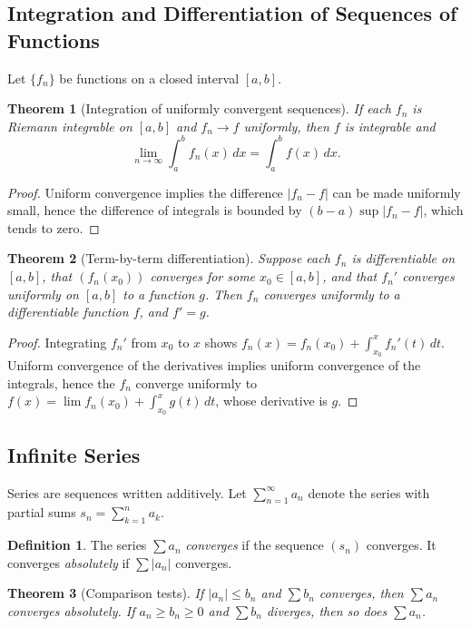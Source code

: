\documentclass{article}
\theoremstyle{definition}
\newtheorem{definition}{Definition}[section]
\theoremstyle{plain}
\newtheorem{theorem}{Theorem}[section]
\begin{document}
\subsection{Integration and Differentiation of Sequences of Functions}\label{subsec:integration-sequences}
Let $\{f_n\}$ be functions on a closed interval $[a,b]$.

\begin{theorem}[Integration of uniformly convergent sequences]\label{thm:uniform-integral}
	If each $f_n$ is Riemann integrable on $[a,b]$ and $f_n \to f$ uniformly, then $f$ is integrable and
	\[
		\lim_{n\to\infty} \int_a^b f_n(x)\,dx = \int_a^b f(x)\,dx.
	\]
\end{theorem}
\begin{proof}
	Uniform convergence implies the difference $|f_n-f|$ can be made uniformly small, hence the difference of integrals is bounded by $(b-a)\sup|f_n-f|$, which tends to zero.
\end{proof}

\begin{theorem}[Term-by-term differentiation]\label{thm:termwise-derivative}
	Suppose each $f_n$ is differentiable on $[a,b]$, that $(f_n(x_0))$ converges for some $x_0\in [a,b]$, and that $f_n'$ converges uniformly on $[a,b]$ to a function $g$. Then $f_n$ converges uniformly to a differentiable function $f$, and $f'=g$.
\end{theorem}
\begin{proof}
	Integrating $f_n'$ from $x_0$ to $x$ shows $f_n(x)=f_n(x_0)+\int_{x_0}^x f_n'(t)\,dt$. Uniform convergence of the derivatives implies uniform convergence of the integrals, hence the $f_n$ converge uniformly to $f(x)=\lim f_n(x_0)+\int_{x_0}^x g(t)\,dt$, whose derivative is $g$.
\end{proof}

\subsection{Infinite Series}\label{subsec:infinite-series}
Series are sequences written additively. Let $\sum_{n=1}^\infty a_n$ denote the series with partial sums $s_n = \sum_{k=1}^n a_k$.

\begin{definition}\label{def:series}
	The series $\sum a_n$ \emph{converges} if the sequence $(s_n)$ converges. It converges \emph{absolutely} if $\sum |a_n|$ converges.
\end{definition}

\begin{theorem}[Comparison tests]
	If $|a_n|\le b_n$ and $\sum b_n$ converges, then $\sum a_n$ converges absolutely. If $a_n\ge b_n\ge 0$ and $\sum b_n$ diverges, then so does $\sum a_n$.
\end{theorem}
\end{document}
